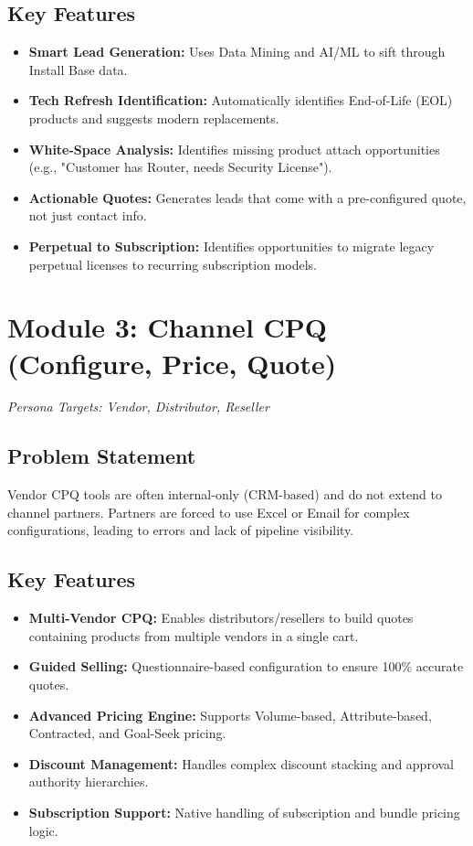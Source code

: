\documentclass[12pt,a4paper]{article}
\begin{document}
\subsection{Key Features}
\begin{itemize}
    \item \textbf{Smart Lead Generation:} Uses Data Mining and AI/ML to sift through Install Base data.
    \item \textbf{Tech Refresh Identification:} Automatically identifies End-of-Life (EOL) products and suggests modern replacements.
    \item \textbf{White-Space Analysis:} Identifies missing product attach opportunities (e.g., "Customer has Router, needs Security License").
    \item \textbf{Actionable Quotes:} Generates leads that come with a pre-configured quote, not just contact info.
    \item \textbf{Perpetual to Subscription:} Identifies opportunities to migrate legacy perpetual licenses to recurring subscription models.
\end{itemize}

\section{Module 3: Channel CPQ (Configure, Price, Quote)}
\textit{Persona Targets: Vendor, Distributor, Reseller}

\subsection{Problem Statement}
Vendor CPQ tools are often internal-only (CRM-based) and do not extend to channel partners. Partners are forced to use Excel or Email for complex configurations, leading to errors and lack of pipeline visibility.

\subsection{Key Features}
\begin{itemize}
    \item \textbf{Multi-Vendor CPQ:} Enables distributors/resellers to build quotes containing products from multiple vendors in a single cart.
    \item \textbf{Guided Selling:} Questionnaire-based configuration to ensure 100\% accurate quotes.
    \item \textbf{Advanced Pricing Engine:} Supports Volume-based, Attribute-based, Contracted, and Goal-Seek pricing.
    \item \textbf{Discount Management:} Handles complex discount stacking and approval authority hierarchies.
    \item \textbf{Subscription Support:} Native handling of subscription and bundle pricing logic.
\end{itemize}
\end{document}

